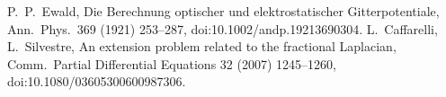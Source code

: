  P.~P.~Ewald, Die Berechnung optischer und elektrostatischer Gitterpotentiale, Ann.\ Phys.\ 369 (1921) 253--287, doi:10.1002/andp.19213690304.
 L.~Caffarelli, L.~Silvestre, An extension problem related to the fractional Laplacian, Comm.\ Partial Differential Equations 32 (2007) 1245--1260, doi:10.1080/03605300600987306.
